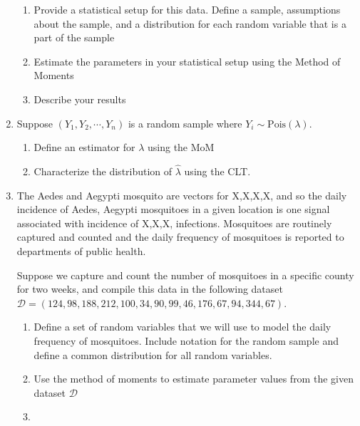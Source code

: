 \begin{enumerate}
    \begin{enumerate}
        \item Provide a statistical setup for this data. Define a sample, assumptions about the sample, and a distribution for each random variable that is a part of the sample
        \item Estimate the parameters in your statistical setup using the Method of Moments
        \item Describe your results
    \end{enumerate}
    
    \item Suppose $(Y_{1},Y_{2},\cdots,Y_{n})$ is a random sample where $Y_{i} \sim \text{Pois}(\lambda)$.
    \begin{enumerate}
        \item Define an estimator for $\lambda$ using the MoM
        \item Characterize the distribution of $\hat{\lambda}$ using the CLT.
    \end{enumerate}
    
    \item The Aedes and Aegypti mosquito are vectors for X,X,X,X, and so the daily incidence of Aedes, Aegypti mosquitoes in a given location is one signal associated with incidence of X,X,X, infections. Mosquitoes are routinely captured and counted and the daily frequency of mosquitoes is reported to departments of public health.
    
    Suppose we capture and count the number of mosquitoes in a specific county for two weeks, and compile this data in the following dataset $\mathcal{D} = (124,98,188,212,100,34,90,99,46,176,67,94,344,67)$.
    
    \begin{enumerate}
        \item Define a set of random variables that we will use to model the daily frequency of mosquitoes. Include notation for the random sample and define a common distribution for all random variables.
        \item Use the method of moments to estimate parameter values from the given dataset $\mathcal{D}$
        \item 
    \end{enumerate}
    
\end{enumerate}
